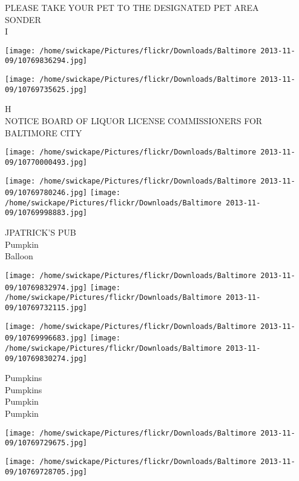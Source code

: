 \documentclass[10pt,letterpaper]{article}
\begin{document}
PLEASE TAKE YOUR PET TO THE DESIGNATED PET AREA\\
SONDER\\
I\\
\pagebreak

\texttt{[image: /home/swickape/Pictures/flickr/Downloads/Baltimore 2013-11-09/10769836294.jpg]}

\vspace{0.25in}
\texttt{[image: /home/swickape/Pictures/flickr/Downloads/Baltimore 2013-11-09/10769735625.jpg]}

H\\
NOTICE BOARD OF LIQUOR LICENSE COMMISSIONERS FOR BALTIMORE CITY\\
\pagebreak

\texttt{[image: /home/swickape/Pictures/flickr/Downloads/Baltimore 2013-11-09/10770000493.jpg]}

\vspace{0.25in}
\texttt{[image: /home/swickape/Pictures/flickr/Downloads/Baltimore 2013-11-09/10769780246.jpg]}
\texttt{[image: /home/swickape/Pictures/flickr/Downloads/Baltimore 2013-11-09/10769998883.jpg]}

JPATRICK'S PUB\\
Pumpkin\\
Balloon\\
\pagebreak

\texttt{[image: /home/swickape/Pictures/flickr/Downloads/Baltimore 2013-11-09/10769832974.jpg]}
\texttt{[image: /home/swickape/Pictures/flickr/Downloads/Baltimore 2013-11-09/10769732115.jpg]}

\texttt{[image: /home/swickape/Pictures/flickr/Downloads/Baltimore 2013-11-09/10769996683.jpg]}
\texttt{[image: /home/swickape/Pictures/flickr/Downloads/Baltimore 2013-11-09/10769830274.jpg]}

Pumpkins\\
Pumpkins\\
Pumpkin\\
Pumpkin\\
\pagebreak

\texttt{[image: /home/swickape/Pictures/flickr/Downloads/Baltimore 2013-11-09/10769729675.jpg]}

\vspace{0.25in}
\texttt{[image: /home/swickape/Pictures/flickr/Downloads/Baltimore 2013-11-09/10769728705.jpg]}
\end{document}

